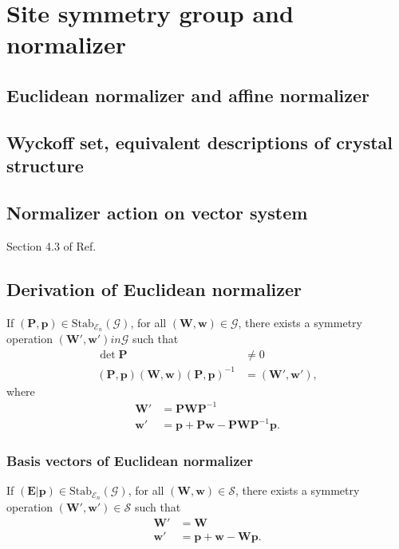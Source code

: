 \section{\label{sec:normalizer}Site symmetry group and normalizer}

\subsection{Euclidean normalizer and affine normalizer}

\subsection{Wyckoff set, equivalent descriptions of crystal structure}

\subsection{Normalizer action on vector system}

Section 4.3 of Ref.~\cite{Souvignier08}

\subsection{Derivation of Euclidean normalizer}

If $( \bm{P}, \bm{p} ) \in \mathrm{Stab}_{\mathcal{E}_{n}}(\mathcal{G})$, for all $(\bm{W}, \bm{w}) \in \mathcal{G}$, there exists a symmetry operation $(\bm{W}', \bm{w}') in \mathcal{G}$ such that
\begin{align}
    \det \bm{P} &\neq 0 \\
    (\bm{P}, \bm{p}) (\bm{W}, \bm{w}) (\bm{P}, \bm{p})^{-1} &= (\bm{W}', \bm{w}'),
\end{align}
where
\begin{align}
  \bm{W}' &= \bm{P} \bm{W} \bm{P}^{-1} \\
  \bm{w}' &= \bm{p} + \bm{Pw} - \bm{PW}\bm{P}^{-1}\bm{p}.
\end{align}

\subsubsection{Basis vectors of Euclidean normalizer}

If $( \bm{E} | \bm{p} ) \in \mathrm{Stab}_{\mathcal{E}_{n}}(\mathcal{G}) $, for all $(\bm{W}, \bm{w} ) \in \mathcal{S}$, there exists a symmetry operation $(\bm{W}', \bm{w}' ) \in \mathcal{S}$ such that
\begin{align}
  \bm{W}' &= \bm{W} \\
  \bm{w}' &= \bm{p} + \bm{w} - \bm{Wp}.
\end{align}

